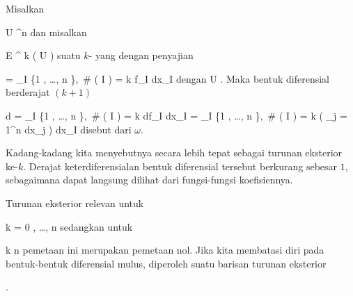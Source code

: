 {}
{

Misalkan

\mavergleichskette
{\vergleichskette
{ U
}
{ \subseteq }{ \R^n
}
{  }{
}
{    }{
}
{   }{
}
}
{}{}{}
dan misalkan

\mavergleichskette
{\vergleichskette
{ \omega
}
{ \in }{
{ \mathcal E }^{ k } (  U   )
}
{  }{
}
{    }{
}
{   }{
}
}
{}{}{}
suatu
$k$-
yang 
dengan penyajian

\mavergleichskettedisp
{\vergleichskette
{ \omega
}
{ =} { \sum_{I \subseteq \{1 , \ldots , n \},\, { \# \left(   I  \right) } = k } f_I dx_I
}
{ } {
}
{ } {
}
{ } {
}
}
{}{}{}
dengan
 { U } {\R
} {.}
Maka bentuk diferensial berderajat $(k+1)$

\mavergleichskettedisp
{\vergleichskette
{d \omega
}
{ =} { \sum_{I \subseteq \{1 , \ldots , n \},\,  { \# \left(   I  \right) } = k } df_I \wedge dx_I
}
{ =} { \sum_{I \subseteq \{1 , \ldots , n \},\,  { \# \left(   I  \right) } = k } \left(  \sum_{j = 1}^n {  } dx_j  \right)  \wedge dx_I
}
{ } {
}
{ } {
}
}
{}{}{}
disebut  dari $\omega$.

}

Kadang-kadang kita menyebutnya secara lebih tepat sebagai turunan eksterior ke-$k$. Derajat keterdiferensialan bentuk diferensial tersebut berkurang sebesar $1$, sebagaimana dapat langsung dilihat dari fungsi-fungsi koefisiennya.

Turunan eksterior relevan untuk

\mavergleichskette
{\vergleichskette
{ k
}
{ = }{ 0 , \ldots , n
}
{  }{
}
{    }{
}
{   }{
}
}
{}{}{}
sedangkan untuk

\mavergleichskette
{\vergleichskette
{ k
}
{ \geq }{ n
}
{  }{
}
{    }{
}
{   }{
}
}
{}{}{}
pemetaan ini merupakan pemetaan nol. Jika kita membatasi diri pada bentuk-bentuk diferensial mulus, diperoleh suatu barisan turunan eksterior

 { . }

